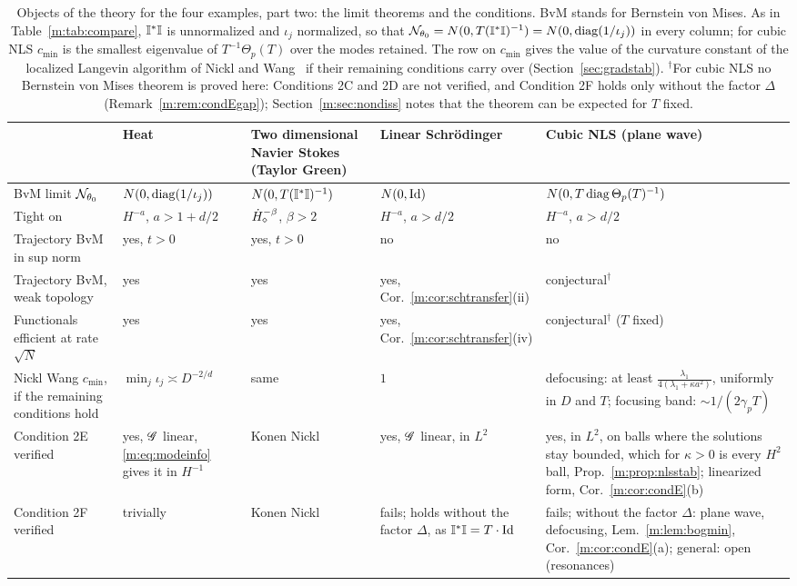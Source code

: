 \begin{table}[tp]\centering\scriptsize
\setlength{\tabcolsep}{2pt}
\caption{Objects of the theory for the four examples, part two: the limit theorems and the conditions. BvM stands for Bernstein von Mises. As in Table~\ref{m:tab:compare}, $\mathbb{I}^*\mathbb{I}$ is unnormalized and $\iota_j$ normalized, so that $\mathcal{N}_{\theta_0}=N(0,T(\mathbb{I}^*\mathbb{I})^{-1})=N(0,\operatorname{diag}(1/\iota_j))$ in every column; for cubic NLS $c_{\min}$ is the smallest eigenvalue of $T^{-1}\Theta_p(T)$ over the modes retained. The row on $c_{\min}$ gives the value of the curvature constant of the localized Langevin algorithm of Nickl and Wang~\cite{nicklwang2024} if their remaining conditions carry over (Section~\ref{sec:gradstab}). $^\dagger$For cubic NLS no Bernstein von Mises theorem is proved here: Conditions 2C and 2D are not verified, and Condition 2F holds only without the factor $\Delta$ (Remark~\ref{m:rem:condEgap}); Section~\ref{m:sec:nondiss} notes that the theorem can be expected for $T$ fixed.}\label{m:tab:guarantee}
\begin{tabular}{>{\raggedright\arraybackslash}p{}>{\raggedright\arraybackslash}p{}>{\raggedright\arraybackslash}p{}>{\raggedright\arraybackslash}p{}>{\raggedright\arraybackslash}p{}}
\toprule
& Heat & Two dimensional Navier Stokes (Taylor Green) & Linear Schr\"odinger & Cubic NLS (plane wave)\\
\midrule
BvM limit $\mathcal{N}_{\theta_0}$ & $N(0,\operatorname{diag}(1/\iota_j))$ & $N(0,T(\mathbb{I}^*\mathbb{I})^{-1})$ & $N(0,\operatorname{Id})$ & $N(0,T\operatorname{diag}\Theta_p(T)^{-1})$\\
Tight on & $H^{-a}$, $a>1+d/2$ & $\dot H^{-\beta}_\diamond$, $\beta>2$ & $H^{-a}$, $a>d/2$ & $H^{-a}$, $a>d/2$\\
Trajectory BvM in sup norm & yes, $t>0$ & yes, $t>0$ & no & no\\
Trajectory BvM, weak topology & yes & yes & yes, Cor.~\ref{m:cor:schtransfer}(ii) & conjectural$^\dagger$\\
Functionals efficient at rate $\sqrt N$ & yes & yes & yes, Cor.~\ref{m:cor:schtransfer}(iv) & conjectural$^\dagger$ ($T$ fixed)\\
Nickl Wang $c_{\min}$, if the remaining conditions hold & $\min_j\iota_j\asymp D^{-2/d}$ & same & $1$ & defocusing: at least $\frac{\lambda_1}{4(\lambda_1+\kappa a^2)}$, uniformly in $D$ and $T$; focusing band: $\sim1/(2\gamma_pT)$\\
Condition 2E verified & yes, $\mathscr{G}$ linear, \eqref{m:eq:modeinfo} gives it in $H^{-1}$ & Konen Nickl & yes, $\mathscr{G}$ linear, in $L^2$ & yes, in $L^2$, on balls where the solutions stay bounded, which for $\kappa>0$ is every $H^2$ ball, Prop.~\ref{m:prop:nlsstab}; linearized form, Cor.~\ref{m:cor:condE}(b)\\
Condition 2F verified & trivially & Konen Nickl & fails; holds without the factor $\Delta$, as $\mathbb{I}^*\mathbb{I}=T\cdot\operatorname{Id}$ & fails; without the factor $\Delta$: plane wave, defocusing, Lem.~\ref{m:lem:bogmin}, Cor.~\ref{m:cor:condE}(a); general: open (resonances)\\
\bottomrule
\end{tabular}
\end{table}

